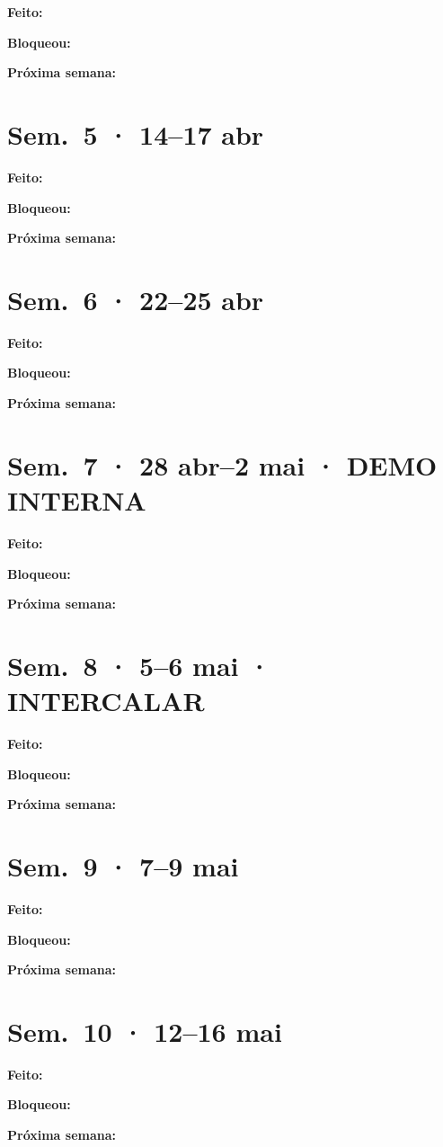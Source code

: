 \documentclass[a4paper,11pt]{article}
\newcommand{\semana}[2]{%
    \section{Sem.\ #1 · #2}%
}
\begin{document}
\textbf{Feito:}

\textbf{Bloqueou:}

\textbf{Próxima semana:}

\semana{5}{14--17 abr}

\textbf{Feito:}

\textbf{Bloqueou:}

\textbf{Próxima semana:}

\semana{6}{22--25 abr}

\textbf{Feito:}

\textbf{Bloqueou:}

\textbf{Próxima semana:}

\semana{7}{28 abr--2 mai · DEMO INTERNA}

\textbf{Feito:}

\textbf{Bloqueou:}

\textbf{Próxima semana:}

\semana{8}{5--6 mai · INTERCALAR}

\textbf{Feito:}

\textbf{Bloqueou:}

\textbf{Próxima semana:}

\semana{9}{7--9 mai}

\textbf{Feito:}

\textbf{Bloqueou:}

\textbf{Próxima semana:}

\semana{10}{12--16 mai}

\textbf{Feito:}

\textbf{Bloqueou:}

\textbf{Próxima semana:}
\end{document}
